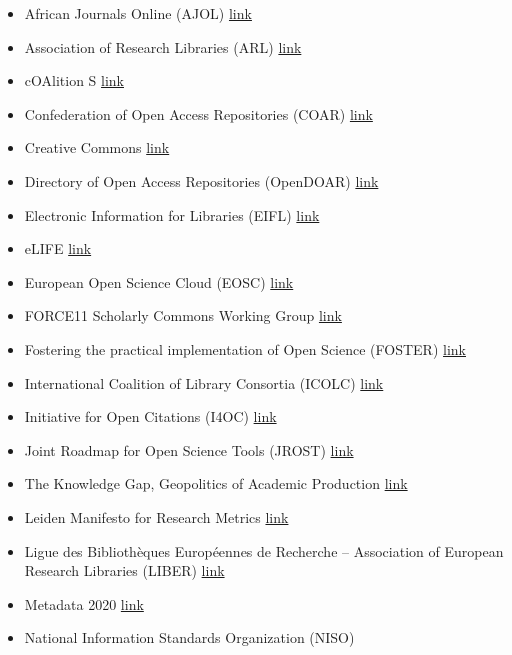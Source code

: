 \begin{itemize}
\item
  African Journals Online (AJOL) \href{https://www.ajol.info/}{link}
\item
  Association of Research Libraries (ARL)
  \href{https://www.arl.org/}{link}
\item
  cOAlition S \href{https://www.coalition-s.org/about/}{link}
\item
  Confederation of Open Access Repositories (COAR)
  \href{https://www.coar-repositories.org/}{link}
\item
  Creative Commons \href{https://creativecommons.org/}{link}
\item
  Directory of Open Access Repositories (OpenDOAR)
  \href{https://v2.sherpa.ac.uk/opendoar/}{link}
\item
  Electronic Information for Libraries (EIFL)
  \href{http://www.eifl.net/}{link}
\item
  eLIFE \href{https://elifesciences.org/}{link}
\item
  European Open Science Cloud (EOSC)
  \href{https://ec.europa.eu/research/openscience/index.cfm?pg=open-science-cloud}{link}
\item
  FORCE11 Scholarly Commons Working Group
  \href{https://www.force11.org/group/scholarly-commons-working-group}{link}
\item
  Fostering the practical implementation of Open Science (FOSTER)
  \href{https://www.fosteropenscience.eu/}{link}
\item
  International Coalition of Library Consortia (ICOLC)
  \href{https://icolc.net/}{link}
\item
  Initiative for Open Citations (I4OC) \href{https://i4oc.org/}{link}
\item
  Joint Roadmap for Open Science Tools (JROST)
  \href{https://jrost.org/}{link}
\item
  The Knowledge Gap, Geopolitics of Academic Production
  \href{http://knowledgegap.org/index.php/sub-projects/knowledge-and-power-inequality-in-open-science-policies/}{link}
\item
  Leiden Manifesto for Research Metrics
  \href{http://www.leidenmanifesto.org/}{link}
\item
  Ligue des Bibliothèques Européennes de Recherche -- Association of
  European Research Libraries (LIBER)
  \href{https://libereurope.eu/}{link}
\item
  Metadata 2020 \href{http://www.metadata2020.org/}{link}
\item
  National Information Standards Organization (NISO)

\end{itemize}
